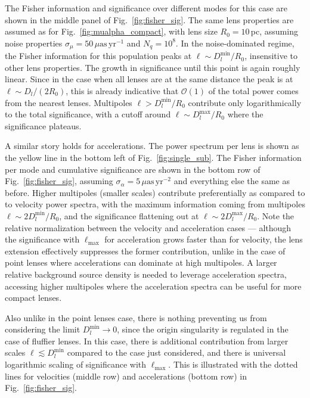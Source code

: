 \documentclass[twocolumn]{aastex63}
\begin{document}
The Fisher information and significance over different modes for this case are shown in the middle panel of Fig.~\ref{fig:fisher_sig}. The same lens properties are assumed as for Fig.~\ref{fig:mualpha_compact}, with lens size $R_0=10$\,pc, assuming noise properties $\sigma_\mu = 50\,\mu\mathrm{as}\,\mathrm{yr}^{-1}$ and $N_q = 10^8$. In the noise-dominated regime, the Fisher information for this population peaks at $\ell \sim D_l^{\mathrm{min}}/R_0$, insensitive to other lens properties. The growth in significance until this point is again roughly linear. Since in the case when all lenses are at the same distance the peak is at $\ell \sim D_l/(2 R_0)$, this is already indicative that $\mathcal{O}(1)$ of the total power comes from the nearest lenses. Multipoles $\ell > D_l^{\mathrm{min}}/R_0$ contribute only logarithmically to the total significance, with a cutoff around $\ell \sim D_l^{\mathrm{max}}/R_0$ where the significance plateaus. 

A similar story holds for accelerations. The power spectrum per lens is shown as the yellow line in the bottom left of Fig.~\ref{fig:single_sub}. The Fisher information per mode and cumulative significance are shown in the bottom row of Fig.~\ref{fig:fisher_sig}, assuming $\sigma_\alpha = 5\,\mu\mathrm{as}\,\mathrm{yr}^{-2}$ and everything else the same as before. Higher multipoles (smaller scales) contribute preferentially as compared to to velocity power spectra, with the maximum information coming from multipoles $\ell \sim 2D_l^{\mathrm{min}}/R_0$, and the significance flattening out at $\ell \sim 2D_l^{\mathrm{max}}/R_0$. Note the relative normalization between the velocity and acceleration cases --- although the significance with $\ell_\mathrm{max}$ for acceleration grows faster than for velocity, the lens extension effectively suppresses the former contribution, unlike in the case of point lenses where accelerations can dominate at high multipoles. A larger relative background source density is needed to leverage acceleration spectra, accessing higher multipoles where the acceleration spectra can be useful for more compact lenses.


Also unlike in the point lenses case, there is nothing preventing us from considering the limit $D_l^\mathrm{min}\rightarrow0$, since the origin singularity is regulated in the case of fluffier lenses. In this case, there is additional contribution from larger scales $\ell\lesssim D_l^\mathrm{min}$ compared to the case just considered, and there is universal logarithmic scaling of significance with $\ell_\mathrm{max}$. This is illustrated with the dotted lines for velocities (middle row) and accelerations (bottom row) in Fig.~\ref{fig:fisher_sig}.
\end{document}

